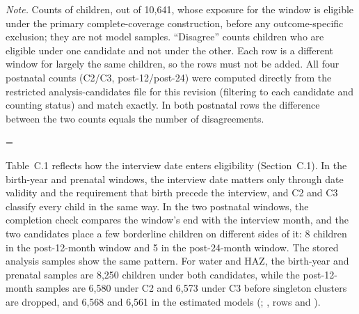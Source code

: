 \begin{ThesisTableNote}

\raggedright

\emph{Note.} Counts of children, out of 10,641, whose exposure for the window is eligible under the primary complete-coverage construction, before any outcome-specific exclusion; they are not model samples. ``Disagree'' counts children who are eligible under one candidate and not under the other. Each row is a different window for largely the same children, so the rows must not be added. All four postnatal counts (C2/C3, post-12/post-24) were computed directly from the restricted analysis-candidates file for this revision (filtering to each candidate and counting  status) and match exactly. In both postnatal rows the difference between the two counts equals the number of disagreements.

\end{ThesisTableNote}

\begingroup\edef\ThesisSavedIndent{\the\parindent}\raggedright\parindent=\ThesisSavedIndent\relax{}

Table~C.1 reflects how the interview date enters eligibility (Section~C.1). In the birth-year and prenatal windows, the interview date matters only through date validity and the requirement that birth precede the interview, and C2 and C3 classify every child in the same way. In the two postnatal windows, the completion check compares the window's end with the interview month, and the two candidates place a few borderline children on different sides of it: 8 children in the post-12-month window and 5 in the post-24-month window. The stored analysis samples show the same pattern. For water and HAZ, the birth-year and prenatal samples are 8,250 children under both candidates, while the post-12-month samples are 6,580 under C2 and 6,573 under C3 before singleton clusters are dropped, and 6,568 and 6,561 in the estimated models (; , rows  and ).

\par\endgroup

